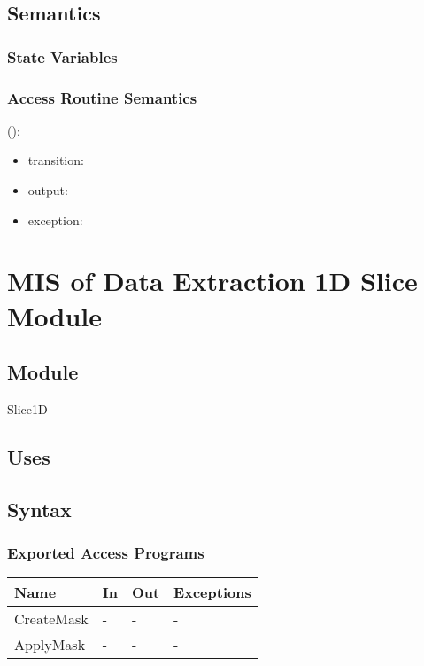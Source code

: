 \documentclass[12pt, titlepage]{article}
\begin{document}
\subsection{Semantics}

\subsubsection{State Variables}


\subsubsection{Access Routine Semantics}

\noindent {}():
\begin{itemize}
\item transition:  
\item output:  
\item exception:  
\end{itemize}

\section{MIS of Data Extraction 1D Slice Module} \label{Mod:Slice1D}

\subsection{Module}

Slice1D

\subsection{Uses}


\subsection{Syntax}

\subsubsection{Exported Access Programs}

\begin{center}
\begin{tabular}{p{2cm} p{4cm} p{4cm} p{2cm}}
\hline
\textbf{Name} & \textbf{In} & \textbf{Out} & \textbf{Exceptions} \\
\hline
CreateMask & - & - & - \\
ApplyMask & - & - & - \\
\hline
\end{tabular}
\end{center}
\end{document}
